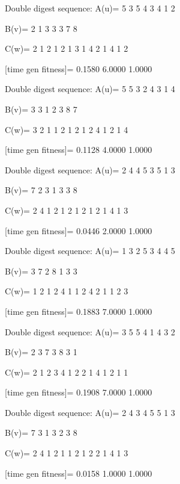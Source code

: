 Double digest sequence:
A(u)=
     5     3     5     4     3     4     1     2

B(v)=
     2     1     3     3     3     7     8

C(w)=
     2     1     2     1     2     1     3     1     4     2     1     4     1     2

[time gen fitness]=
    0.1580    6.0000    1.0000

Double digest sequence:
A(u)=
     5     5     3     2     4     3     1     4

B(v)=
     3     3     1     2     3     8     7

C(w)=
     3     2     1     1     2     1     2     1     2     4     1     2     1     4

[time gen fitness]=
    0.1128    4.0000    1.0000

Double digest sequence:
A(u)=
     2     4     4     5     3     5     1     3

B(v)=
     7     2     3     1     3     3     8

C(w)=
     2     4     1     2     1     2     1     2     1     2     1     4     1     3

[time gen fitness]=
    0.0446    2.0000    1.0000

Double digest sequence:
A(u)=
     1     3     2     5     3     4     4     5

B(v)=
     3     7     2     8     1     3     3

C(w)=
     1     2     1     2     4     1     1     2     4     2     1     1     2     3

[time gen fitness]=
    0.1883    7.0000    1.0000

Double digest sequence:
A(u)=
     3     5     5     4     1     4     3     2

B(v)=
     2     3     7     3     8     3     1

C(w)=
     2     1     2     3     4     1     2     2     1     4     1     2     1     1

[time gen fitness]=
    0.1908    7.0000    1.0000

Double digest sequence:
A(u)=
     2     4     3     4     5     5     1     3

B(v)=
     7     3     1     3     2     3     8

C(w)=
     2     4     1     2     1     1     2     1     2     2     1     4     1     3

[time gen fitness]=
    0.0158    1.0000    1.0000

